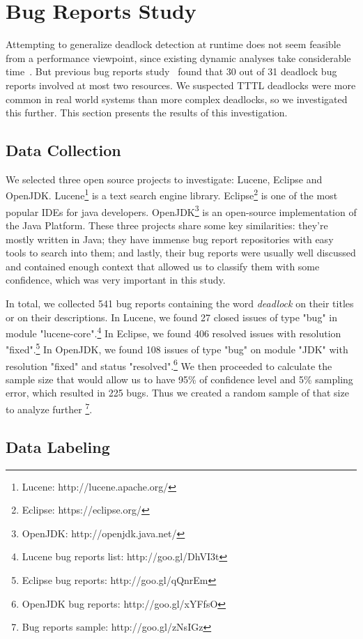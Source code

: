 \section{Bug Reports Study}\label{bugs}

Attempting to generalize deadlock detection at runtime does not seem feasible from a performance viewpoint, since existing dynamic analyses take considerable time~\cite{magicfuzzer}. But previous bug reports study~\cite{lu} found that 30 out of 31 deadlock bug reports involved at most two resources. We suspected TTTL deadlocks were more common in real world systems than more complex deadlocks, so we investigated this further. This section presents the results of this investigation.

\subsection{Data Collection}

We selected three open source projects to investigate: Lucene, Eclipse and OpenJDK. Lucene\footnote{Lucene: http://lucene.apache.org/} is a text search engine library. Eclipse\footnote{Eclipse: https://eclipse.org/} is one of the most popular IDEs for java developers. OpenJDK\footnote{OpenJDK: http://openjdk.java.net/} is an open-source implementation of the Java Platform. These three projects share some key similarities: they're mostly written in Java; they have immense bug report repositories with easy tools to search into them; and lastly, their bug reports were usually well discussed and contained enough context that allowed us to classify them with some confidence, which was very important in this study.

In total, we collected 541 bug reports containing the word \emph{deadlock} on their titles or on their descriptions. In Lucene, we found 27 closed issues of type "bug" in module "lucene-core".\footnote{Lucene bug reports list: http://goo.gl/DhVI3t}
In Eclipse, we found 406 resolved issues with resolution "fixed".\footnote{Eclipse bug reports: http://goo.gl/qQnrEm}
In OpenJDK, we found 108 issues of type "bug" on module "JDK" with resolution "fixed" and status "resolved".\footnote{OpenJDK bug reports: http://goo.gl/xYFfsO} We then proceeded to calculate the sample size that would allow us to have 95\% of confidence level and 5\% sampling error,  which resulted in 225 bugs. Thus we created a random sample of that size to analyze further \footnote{Bug reports sample: http://goo.gl/zNsIGz}.

\subsection{Data Labeling}

